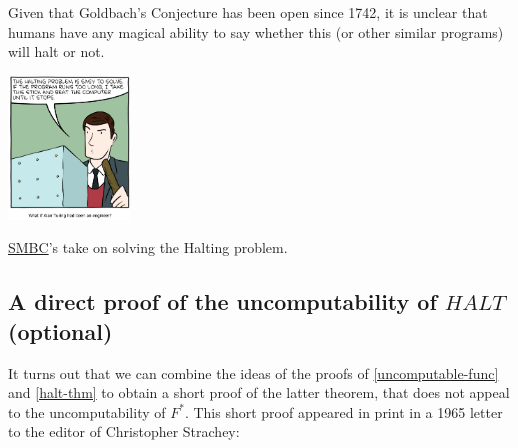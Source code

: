 Given that Goldbach's Conjecture has been open since 1742, it is unclear
that humans have any magical ability to say whether this (or other
similar programs) will halt or not.


\begin{marginfigure}
\centering
\includegraphics[width=\linewidth, height=1.5in, keepaspectratio]{../figure/smbchalting.png}
\caption{\href{http://smbc-comics.com/comic/halting}{SMBC}'s take on
solving the Halting problem.}
\label{xkcdhaltingfig}
\end{marginfigure}

\subsection{A direct proof of the uncomputability of
\(\ensuremath{\mathit{HALT}}\) (optional)}\label{haltalternativesec}

It turns out that we can combine the ideas of the proofs of
\cref{uncomputable-func} and \cref{halt-thm} to obtain a short proof of
the latter theorem, that does not appeal to the uncomputability of
\(F^*\). This short proof appeared in print in a 1965 letter to the
editor of Christopher Strachey:

